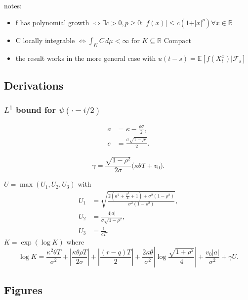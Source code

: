notes:
\begin{itemize}
\item[$\bullet$] f has polynomial growth $\Leftrightarrow \exists c>0,p\geq 0:|f(x)|\leq c(1+\vert x \vert^p)\forall x\in\mathbb{R}$
\item[$\bullet$] C locally integrable $\Leftrightarrow \int_K C \,d\mu<\infty \text{ for } K \subseteq \mathbb{R} \text{ Compact}$
\item[$\bullet$] the result works in the more general case with $u(t-s)=\mathbb{E}[f(X_t^x)|\mathcal{F}_s]$
\end{itemize}


\subsection{Derivations}

\subsubsection{$L^1$ bound for $\psi(\cdot-i/2)$}
\label{app:l1bound}
\begin{align}
a &= \kappa - \frac{\rho\sigma}{2}, \\
c &= \frac{\sigma\sqrt{1-\rho^2}}{2}.
\end{align}


\begin{equation}
\gamma = \frac{\sqrt{1-\rho^2}}{2\sigma}\bigl(\kappa\theta T + v_0\bigr).
\end{equation}

$U = \max(U_1, U_2, U_3)$ with
\begin{align}
U_1 &= \sqrt{\frac{2(a^2+\tfrac{\sigma^2}{4}+1)+\sigma^2(1-\rho^2)}{\sigma^2(1-\rho^2)}},\\
U_2 &= \frac{4|a|}{\sigma\sqrt{1-\rho^2}},\\
U_3 &= \frac{1}{cT}.
\end{align}
$K = \exp(\log K)$ where
\begin{equation}
\log K = \frac{\kappa^2\theta T}{\sigma^2}
        +\left|\frac{\kappa\theta\rho T}{2\sigma}\right|
        +\left|\frac{(r-q)T}{2}\right|
        +\frac{2\kappa\theta}{\sigma^2}\left|\log\frac{\sqrt{1+\rho^2}}{4}\right|
        +\frac{v_0|a|}{\sigma^2}
        +\gamma U.
\end{equation}






\subsection{Figures}

